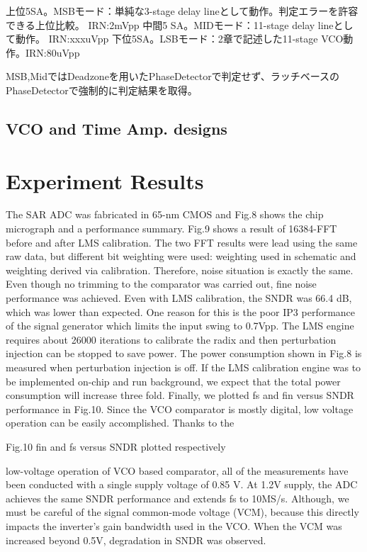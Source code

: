 \documentclass[letterpaper, 10 pt, conference]{ieeeconf}  %
\begin{document}
上位5SA。MSBモード：単純な3-stage delay lineとして動作。判定エラーを許容できる上位比較。 IRN:2mVpp
中間5 SA。MIDモード：11-stage delay lineとして動作。 IRN:xxxuVpp
下位5SA。LSBモード：2章で記述した11-stage VCO動作。IRN:80uVpp

MSB,MidではDeadzoneを用いたPhaseDetectorで判定せず、ラッチベースのPhaseDetectorで強制的に判定結果を取得。

\subsection{VCO and Time Amp. designs}



\section{Experiment Results}
The SAR ADC was fabricated in 65-nm CMOS and Fig.8 shows the chip micrograph and a performance summary. 
Fig.9 shows a result of 16384-FFT before and after LMS calibration. The two FFT results were lead using the same raw data, but different bit weighting were used: weighting used in schematic and weighting derived via calibration. Therefore, noise situation is exactly the same. Even though no trimming to the comparator was carried out, fine noise performance was achieved. Even with LMS calibration, the SNDR was 66.4 dB, which was lower than expected. One reason for this is the poor IP3 performance of the signal generator which limits the input swing to 0.7Vpp.  The LMS engine requires about 26000 iterations to calibrate the radix and then perturbation injection can be stopped to save power. The power consumption shown in Fig.8 is measured when perturbation injection is off. If the LMS calibration engine was to be implemented on-chip and run background, we expect that the total power consumption will increase three fold.
Finally, we plotted fs and fin versus SNDR performance in Fig.10. Since the VCO comparator is mostly digital, low voltage operation can be easily accomplished.  Thanks to the 
 
Fig.10 fin and fs versus SNDR plotted respectively

low-voltage operation of VCO based comparator, all of the measurements have been conducted with a single supply voltage of 0.85 V. At 1.2V supply, the ADC achieves the same SNDR performance and extends fs to 10MS/s. Although, we must be careful of the signal common-mode voltage (VCM), because this directly impacts the inverter’s gain bandwidth used in the VCO. When the VCM was increased beyond 0.5V, degradation in SNDR was observed.
\end{document}
